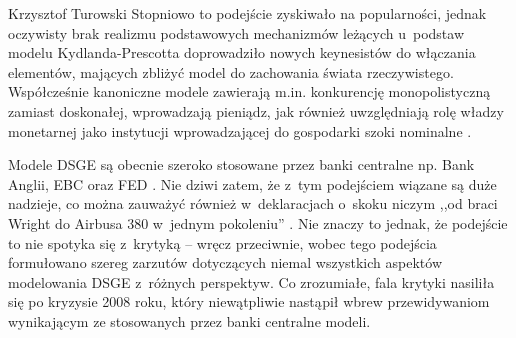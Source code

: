 \begin{artplenv}{Krzysztof Turowski}
Stopniowo to podejście zyskiwało na popularności, jednak oczywisty brak realizmu podstawowych mechanizmów
leżących u~podstaw modelu Kydlanda-Prescotta doprowadziło nowych keynesistów do włączania elementów, mających zbliżyć model do
zachowania świata rzeczywistego. Współcześnie kanoniczne modele zawierają m.in. konkurencję monopolistyczną zamiast
doskonałej, wprowadzają pieniądz, jak również uwzględniają rolę władzy monetarnej jako instytucji wprowadzającej do
gospodarki szoki nominalne
\parencite{fernandez-villaverde_econometrics_2010}.

Modele DSGE są obecnie szeroko stosowane przez banki centralne np. Bank Anglii, EBC oraz FED
\parencite{smets_dsge_2010,tovar_dsge_2009}.
Nie dziwi zatem, że z~tym podejściem wiązane są duże
nadzieje, co można zauważyć również w~deklaracjach o~skoku niczym ,,od braci Wright do Airbusa 380 w~jednym pokoleniu''
\parencite{fernandez-villaverde_econometrics_2010}.
Nie znaczy to jednak, że podejście to nie spotyka się z~krytyką
 --  wręcz przeciwnie, wobec tego podejścia formułowano szereg zarzutów dotyczących niemal wszystkich aspektów
modelowania DSGE z~różnych perspektyw. Co zrozumiałe, fala krytyki nasiliła się po kryzysie 2008 roku, który
niewątpliwie nastąpił wbrew przewidywaniom wynikającym ze stosowanych przez banki centralne modeli.


\end{artplenv}
